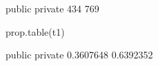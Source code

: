 \begin{Schunk}
\begin{Soutput}
 public private 
    434     769 
\end{Soutput}
\begin{Sinput}
 prop.table(t1)
\end{Sinput}
\begin{Soutput}
   public   private 
0.3607648 0.6392352 
\end{Soutput}
\end{Schunk}

